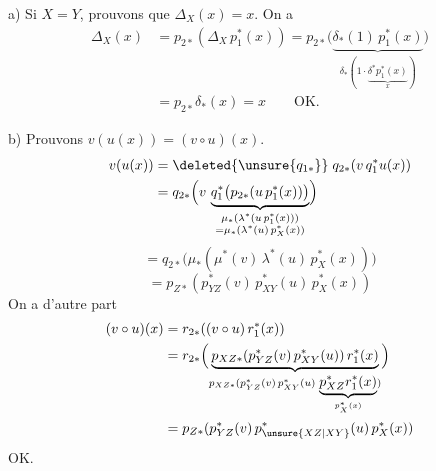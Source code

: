 a) Si $X=Y$, prouvons que $\Delta_X(x)=x$. On a
\[
\begin{aligned}
\Delta_X(x)&=p_{2*}(\Delta_X\,p_1^*(x))
=p_{2*}\bigl(\underbrace{\delta_*(1)\,p_1^*(x)}_{\delta_*(1\cdot\underbrace{\delta^*p_1^*(x)}_x)}\bigr)\\
&=p_{2*}\delta_*(x)=x\qquad\mathrm{OK}.
\end{aligned}
\]

b) Prouvons $v(u(x))=(v\circ u)(x)$.
\[
\begin{aligned}
v(u(x))&=\deleted{\unsure{q_{1*}}}\;q_{2*}(v\,q_1^*u(x))\\
&=q_{2*}\Bigl(v\,\underbrace{q_1^*\bigl(p_{2*}(u\,p_1^*(x))\bigr)}_{\substack{\mu_*(\lambda^*(u\,p_1^*(x)))\\=\mu_*(\lambda^*(u)\,p_X^*(x))}}\Bigr)
\end{aligned}
\]
\deleted{$\unsure{=}$}\quad\deleted{$\unsure{=}$}
\[
=q_{2*}\bigl(\mu_*(\mu^*(v)\,\lambda^*(u)\,p_X^*(x))\bigr)
\]
\[
=p_{Z*}(p_{YZ}^*(v)\,p_{XY}^*(u)\,p_X^*(x))
\]
On a d'autre part
\[
\begin{aligned}
(v\circ u)(x)&=r_{2*}((v\circ u)\,r_1^*(x))\\
&=r_{2*}\Bigl(\underbrace{p_{XZ*}(p_{YZ}^*(v)\,p_{XY}^*(u))\,r_1^*(x)}_{p_{XZ*}(p_{YZ}^*(v)\,p_{XY}^*(u)\,\underbrace{p_{XZ}^*r_1^*(x)}_{p_X^*(x)})}\Bigr)\\
&=p_{Z*}(p_{YZ}^*(v)\,p_{\unsure{XZ|XY}}^*(u)\,p_X^*(x))
\end{aligned}
\]
OK.
